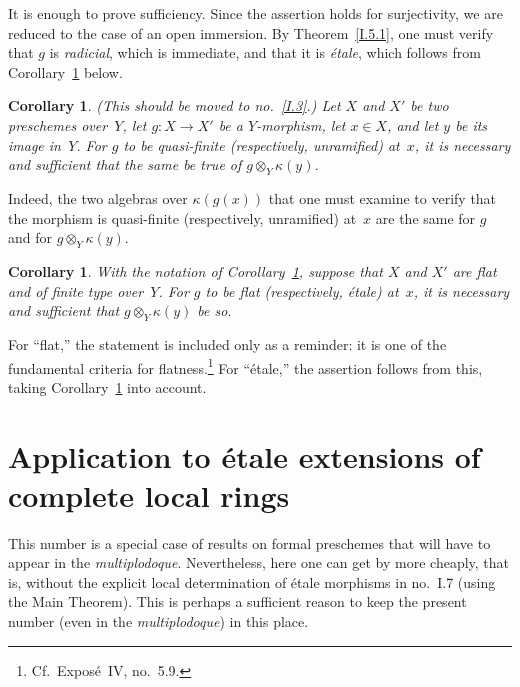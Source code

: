 \documentclass[11pt,oneside]{amsbook}
\newtheorem{corollary}[proposition]{Corollary}
\begin{document}
It is enough to prove sufficiency.  Since the assertion holds for
surjectivity, we are reduced to the case of an open immersion.  By
Theorem~\ref{I.5.1}, one must verify that \(g\) is \emph{radicial}, which
is immediate, and that it is \emph{étale}, which follows from
Corollary~\ref{I.5.9} below.

\begin{corollary}
\label{I.5.8}
(This should be moved to no.~\ref{I.3}.)  Let \(X\) and \(X'\) be
two preschemes over~\(Y\), let \(g\colon X\to X'\) be a \(Y\)-morphism, let
\(x\in X\), and let \(y\) be its image in~\(Y\).  For \(g\) to be
quasi-finite (respectively, unramified) at~\(x\), it is necessary and
sufficient that the same be true of \(g\otimes_Y\kappa(y)\).
\end{corollary}

Indeed, the two algebras over \(\kappa(g(x))\) that one must examine to
verify that the morphism is quasi-finite (respectively, unramified) at~\(x\)
are the same for \(g\) and for \(g\otimes_Y\kappa(y)\).

%
\begin{corollary}
\label{I.5.9}
With the notation of Corollary~\ref{I.5.8}, suppose that \(X\) and \(X'\)
are flat and of finite type over~\(Y\).  For \(g\) to be flat
(respectively, étale) at~\(x\), it is necessary and sufficient that
\(g\otimes_Y\kappa(y)\) be so.
\end{corollary}

For ``flat,'' the statement is included only as a reminder: it is one of
the fundamental criteria for flatness.\footnote{Cf.\ Exposé~IV,
no.~5.9.}  For ``étale,'' the assertion follows from this, taking
Corollary~\ref{I.5.8} into account.


\section{Application to étale extensions of complete local rings}
\label{I.6}

This number is a special case of results on formal preschemes that will have
to appear in the \emph{multiplodoque}.  Nevertheless, here one can get by
more cheaply, that is, without the explicit local determination of étale
morphisms in no.~I.7 (using the Main Theorem).  This is perhaps a
sufficient reason to keep the present number (even in the
\emph{multiplodoque}) in this place.
\end{document}
